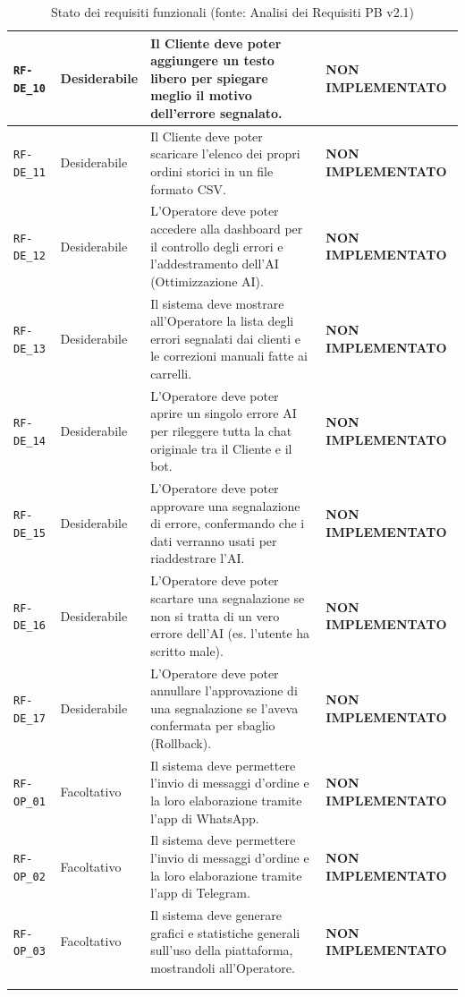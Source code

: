 \documentclass[a4paper, 11pt, oneside]{scrartcl}
\begin{document}
\begin{longtable}{|>{\raggedright\arraybackslash}p{}|>{\raggedright\arraybackslash}p{}|>{\raggedright\arraybackslash}p{}|>{\raggedright\arraybackslash}p{}|}
    \hline
    \texttt{RF-DE\_10} & Desiderabile & Il Cliente deve poter aggiungere un testo libero per spiegare meglio il motivo dell'errore segnalato. & \textbf{NON IMPLEMENTATO} \\
    \hline
    \texttt{RF-DE\_11} & Desiderabile & Il Cliente deve poter scaricare l'elenco dei propri ordini storici in un file formato CSV. & \textbf{NON IMPLEMENTATO} \\
    \hline
    \texttt{RF-DE\_12} & Desiderabile & L'Operatore deve poter accedere alla dashboard per il controllo degli errori e l'addestramento dell'AI (Ottimizzazione AI). & \textbf{NON IMPLEMENTATO} \\
    \hline
    \texttt{RF-DE\_13} & Desiderabile & Il sistema deve mostrare all'Operatore la lista degli errori segnalati dai clienti e le correzioni manuali fatte ai carrelli. & \textbf{NON IMPLEMENTATO} \\
    \hline
    \texttt{RF-DE\_14} & Desiderabile & L'Operatore deve poter aprire un singolo errore AI per rileggere tutta la chat originale tra il Cliente e il bot. & \textbf{NON IMPLEMENTATO} \\
    \hline
    \texttt{RF-DE\_15} & Desiderabile & L'Operatore deve poter approvare una segnalazione di errore, confermando che i dati verranno usati per riaddestrare l'AI. & \textbf{NON IMPLEMENTATO} \\
    \hline
    \texttt{RF-DE\_16} & Desiderabile & L'Operatore deve poter scartare una segnalazione se non si tratta di un vero errore dell'AI (es. l'utente ha scritto male). & \textbf{NON IMPLEMENTATO} \\
    \hline
    \texttt{RF-DE\_17} & Desiderabile & L'Operatore deve poter annullare l'approvazione di una segnalazione se l'aveva confermata per sbaglio (Rollback). & \textbf{NON IMPLEMENTATO} \\
    \texttt{RF-OP\_01} & Facoltativo & Il sistema deve permettere l'invio di messaggi d'ordine e la loro elaborazione tramite l'app di WhatsApp. & \textbf{NON IMPLEMENTATO} \\
    \hline
    \texttt{RF-OP\_02} & Facoltativo & Il sistema deve permettere l'invio di messaggi d'ordine e la loro elaborazione tramite l'app di Telegram. & \textbf{NON IMPLEMENTATO} \\
    \hline
    \texttt{RF-OP\_03} & Facoltativo & Il sistema deve generare grafici e statistiche generali sull'uso della piattaforma, mostrandoli all'Operatore. & \textbf{NON IMPLEMENTATO} \\
    \hline
    \multicolumn{4}{c}{} \\
    \caption{Stato dei requisiti funzionali (fonte: Analisi dei Requisiti PB v2.1)}\label{tab:stato_requisiti_funzionali}
\end{longtable}
\end{document}
